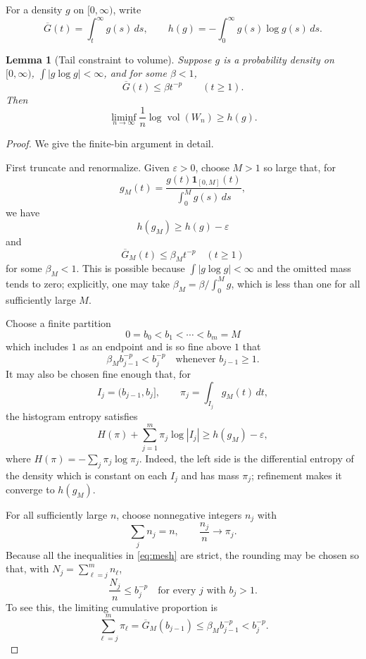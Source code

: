 \documentclass[11pt]{article}
\newtheorem{lemma}{Lemma}
\newcommand{\vol}{\operatorname{vol}}
\newcommand{\1}{\mathbf 1}
\begin{document}
For a density \(g\) on \([0,\infty)\), write
\[
 \overline G(t)=\int_t^\infty g(s)\,ds,\qquad
 h(g)=-\int_0^\infty g(s)\log g(s)\,ds.
\]

\begin{lemma}[Tail constraint to volume]\label{lem:type}
Suppose \(g\) is a probability density on \([0,\infty)\),
\(\int |g\log g|<\infty\), and for some \(\beta<1\),
\[
 \overline G(t)\leq \beta t^{-p}\qquad(t\geq1).
\]
Then
\[
 \liminf_{n\to\infty}\frac1n\log\vol(W_n)\geq h(g).
\]
\end{lemma}

\begin{proof}
We give the finite-bin argument in detail.

First truncate and renormalize.  Given \(\varepsilon>0\), choose \(M>1\)
so large that, for
\[
 g_M(t)=
 \frac{g(t)\1_{[0,M]}(t)}
 {\int_0^M g(s)\,ds},
\]
we have
\[
 h(g_M)\geq h(g)-\varepsilon
\]
and
\[
 \overline G_M(t)\leq\beta_Mt^{-p}\quad(t\geq1)
\]
for some \(\beta_M<1\).  This is possible because
\(\int|g\log g|<\infty\) and the omitted mass tends to zero; explicitly,
one may take
\(\beta_M=\beta/\int_0^M g\), which is less than one for all sufficiently
large \(M\).

Choose a finite partition
\[
 0=b_0<b_1<\cdots<b_m=M
\]
which includes \(1\) as an endpoint and is so fine above \(1\) that
\begin{equation}\label{eq:mesh}
 \beta_M b_{j-1}^{-p}<b_j^{-p}
 \quad\text{whenever }b_{j-1}\geq1.
\end{equation}
It may also be chosen fine enough that, for
\[
 I_j=(b_{j-1},b_j],\qquad
 \pi_j=\int_{I_j}g_M(t)\,dt,
\]
the histogram entropy satisfies
\begin{equation}\label{eq:hist}
 H(\pi)+\sum_{j=1}^m\pi_j\log|I_j|
 \geq h(g_M)-\varepsilon,
\end{equation}
where \(H(\pi)=-\sum_j\pi_j\log\pi_j\).
Indeed, the left side is the differential entropy of the density which
is constant on each \(I_j\) and has mass \(\pi_j\); refinement makes it
converge to \(h(g_M)\).

For all sufficiently large \(n\), choose nonnegative integers \(n_j\)
with
\[
 \sum_jn_j=n,\qquad \frac{n_j}{n}\longrightarrow\pi_j.
\]
Because all the inequalities in \eqref{eq:mesh} are strict, the rounding
may be chosen so that, with \(N_j=\sum_{\ell=j}^mn_\ell\),
\begin{equation}\label{eq:cumulative}
 \frac{N_j}{n}\leq b_j^{-p}
 \quad\text{for every }j\text{ with }b_j>1.
\end{equation}
To see this, the limiting cumulative proportion is
\[
 \sum_{\ell=j}^m\pi_\ell
 =\overline G_M(b_{j-1})
 \leq\beta_Mb_{j-1}^{-p}<b_j^{-p}.
\]


\end{proof}
\end{document}
